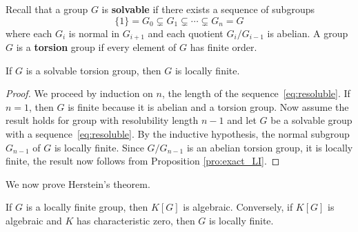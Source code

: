 Recall that a group $G$ is
\textbf{solvable} if there exists a sequence
of subgroups 
\begin{equation}
	\label{eq:resoluble}
	\{1\}=G_0\subsetneq G_1\subsetneq \cdots\subsetneq G_n=G
\end{equation}
where each $G_i$ is normal in $G_{i+1}$ and each 
quotient $G_i/G_{i-1}$ is
abelian.
A group $G$ is a \textbf{torsion} group if every element of $G$
has finite order. 

\begin{proposition}
	If $G$ is a solvable torsion group, 
	then $G$ is locally finite. 
\end{proposition}

\begin{proof}
	We proceed by induction on $n$, the length of the sequence~\eqref{eq:resoluble}. 
	If $n=1$, then $G$ is finite because it is abelian and a torsion group.
	Now assume the result holds for group with resolubility length $n-1$ and let
	$G$ be a solvable group with a sequence~\eqref{eq:resoluble}. By the inductive hypothesis, 
	the normal subgroup $G_{n-1}$ of $G$ is locally finite. Since $G/G_{n-1}$ is an abelian torsion group, 
	it is locally finite, the result now follows from Proposition \ref{pro:exact_LI}.
\end{proof}

We now prove Herstein's theorem.

\begin{theorem}[Herstein]
	If $G$ is a locally finite group, then $K[G]$ is algebraic. Conversely, if 
	$K[G]$ is algebraic and $K$ has characteristic zero, then $G$ 
	is locally finite. 
\end{theorem}


